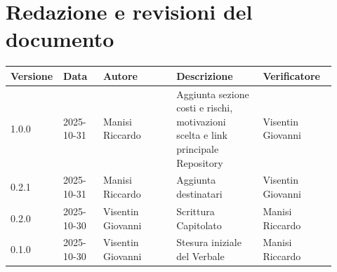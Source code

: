 \documentclass[a4paper,12pt]{article}
\begin{document}
\section{Redazione e revisioni del documento}

\begin{center}
\small
\renewcommand{\arraystretch}{1.2} 
\begin{tabular}{|p{0.1\linewidth}|p{0.12\linewidth}|p{0.22\linewidth}|p{0.26\linewidth}|p{0.22\linewidth}|}
\hline
\rowcolor{gray!60} 
\textbf{Versione} & \textbf{Data} & \textbf{Autore} & \textbf{Descrizione} & \textbf{Verificatore} \\
\hline
\rowcolor{white}
1.0.0 & 2025-10-31 & Manisi Riccardo  & Aggiunta sezione costi e rischi, motivazioni scelta e link principale Repository & Visentin Giovanni \\
\hline
\rowcolor{gray!20}
0.2.1 & 2025-10-31 & Manisi Riccardo & Aggiunta destinatari & Visentin Giovanni\\
\hline
\rowcolor{white}
0.2.0 & 2025-10-30 & Visentin Giovanni & Scrittura Capitolato & Manisi Riccardo \\
\hline
\rowcolor{gray!20}
0.1.0 & 2025-10-30 & Visentin Giovanni & Stesura iniziale del Verbale & Manisi Riccardo \\
\hline

\end{tabular}
\end{center}
\end{document}
